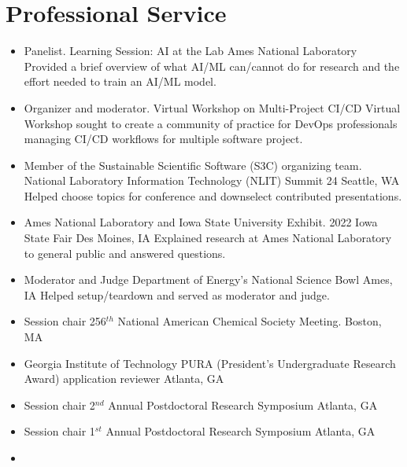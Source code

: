 \documentclass[11pt,a4paper,sans]{moderncv}
\begin{document}
\section{Professional Service}
\vspace{5pt}
\begin{itemize}
	\item{
		{Panelist.}
		{Learning Session: AI at the Lab}
		{Ames National Laboratory}
		{}
		{Provided a brief overview of what AI/ML can/cannot do for research and
		 the effort needed to train an AI/ML model.}}
	\item{
	      {Organizer and moderator.}
	      {Virtual Workshop on Multi-Project CI/CD}
	      {Virtual}
	      {}
	      {Workshop sought to create a community of practice for DevOps 
		  professionals managing CI/CD workflows for multiple software 
		  project.}}
	\item{
		  {Member of the Sustainable Scientific Software (S3C) organizing team.}  
	      {National Laboratory Information Technology (NLIT) Summit 24}
		  {Seattle, WA}
		  {}
		  {Helped choose topics for conference and downselect contributed 
		  presentations.}}
	\item{
		  {Ames National Laboratory and Iowa State University Exhibit.}
	      {2022 Iowa State Fair}
		  {Des Moines, IA}
		  {}
		  {Explained research at Ames National Laboratory to general public and
		   answered questions.}}
	\item{
          {Moderator and Judge}
          {Department of Energy's National Science Bowl}
          {Ames, IA}
          {}
          {Helped setup/teardown and served as moderator and judge.}}
	\item{
	      {Session chair}
          {256$^{th}$ National American Chemical Society Meeting.}
          {Boston, MA}
          {}
          {}}
	\item{
          {Georgia Institute of Technology}
          {PURA (President's Undergraduate Research Award) application reviewer}
          {Atlanta, GA}
          {}
          {}}
	\item{
	     {Session chair}
         {2$^{nd}$ Annual Postdoctoral Research Symposium}
         {Atlanta, GA}
         {}
         {}}
	\item{
          {Session chair}
          {1$^{st}$ Annual Postdoctoral Research Symposium}
          {Atlanta, GA}
          {}
          {}}
	\item{
}
\end{itemize}
\end{document}
